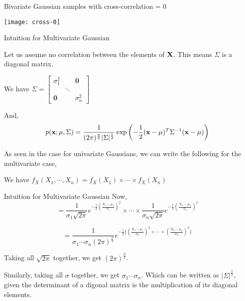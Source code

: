 \documentclass{beamer}
\begin{document}
\begin{frame}{Bivariate Gaussian samples with cross-correlation  = 0}
	\begin{center}
		\texttt{[image: cross-0]}
	\end{center}
\end{frame}



\begin{frame}{Intuition for Multivariate Gaussian}
	
	Let us assume no correlation between the elements of $\bf{X}$. This means $\Sigma$ is a diagonal matrix.
	
	We have $\Sigma = \begin{bmatrix} 
	\sigma_{1}^2 & & \textbf{0}\\
	 & \ddots &\\
	\textbf{0} &  & \sigma_n^2 
	\end{bmatrix}
	$ 
	
	And,
	\begin{gather}
		p(\mathbf{x} ; \mu, \Sigma)=\frac{1}{(2 \pi)^{\frac{n}{2}}|\Sigma|^{\frac{1}{2}}} \exp \left(-\frac{1}{2}(\mathbf{x}-\mu)^{T} \Sigma^{-1}(\mathbf{x}-\mu)\right)
	\end{gather}
	
	As seen in the case for univariate Gaussians, we can write the following for the multivariate case,
	
	We have $f_X(X_1, \cdots, X_n) = f_X(X_1)\times \cdots \times f_X(X_n)$
\end{frame}

\begin{frame}{Intuition for Multivariate Gaussian}
	Now,
	$$=\frac{1}{\sigma_1 \sqrt{2\pi} } e^{-\frac{1}{2}\left(\frac{X_1-\mu_1}{\sigma_1}\right)^2} \times \cdots \times \frac{1}{\sigma_n \sqrt{2\pi} } e^{-\frac{1}{2}\left(\frac{X_n-\mu_n}{\sigma_n}\right)^2}$$
	
	$$= \frac{1}{\sigma_1 \cdots \sigma_n (2\pi)^{\frac{n}{2}} } e^{-\frac{1}{2}\{\left(\frac{X_1-\mu_1}{\sigma_1}\right)^2 + \cdots + \left(\frac{X_n-\mu_n}{\sigma_n}\right)^2 \}}  $$
	
	Taking all $\sqrt{2\pi}$ together, we get $(2\pi)^{\frac{n}{2}}$.
	
	Similarly, taking all $\sigma$ together, we get $\sigma_1 \cdots \sigma_n$. Which can be written as $\vert\Sigma\vert^{\frac{1}{2}}$, given the determinant of a digonal matrix is the multiplication of its diagonal elements.
\end{frame}
\end{document}
